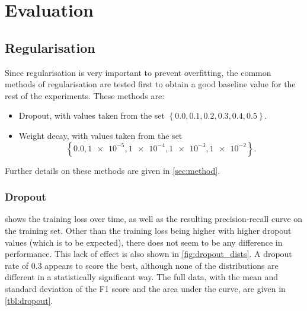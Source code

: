 \section{Evaluation}
\FloatBarrier%

\subsection{Regularisation}
Since regularisation is very important to prevent overfitting, the common
methods of regularisation are tested first to obtain a good baseline value for the
rest of the experiments. These methods are:
\begin{itemize}
  \item Dropout, with values taken from the set
    $\left\{0.0, 0.1, 0.2, 0.3, 0.4, 0.5\right\}$.
  \item Weight decay, with values taken from the set
    \[
      \left\{0.0, \num{1e-5}, \num{1e-4}, \num{1e-3}, \num{1e-2}\right\}.
    \]
\end{itemize}
Further details on these methods are given in \cref{sec:method}.

\subsubsection{Dropout}
 shows the training loss over time, as well as the
resulting precision-recall curve on the training set. Other than the training
loss being higher with higher dropout values (which is to be expected), there
does not seem to be any difference in performance. This lack of effect is also
shown in \cref{fig:dropout_dists}. A dropout rate of 0.3 appears to score the
best, although none of the distributions are different in a statistically
significant way. The full data, with the mean and standard deviation of the F1
score and the area under the curve, are given in
\cref{tbl:dropout}.

